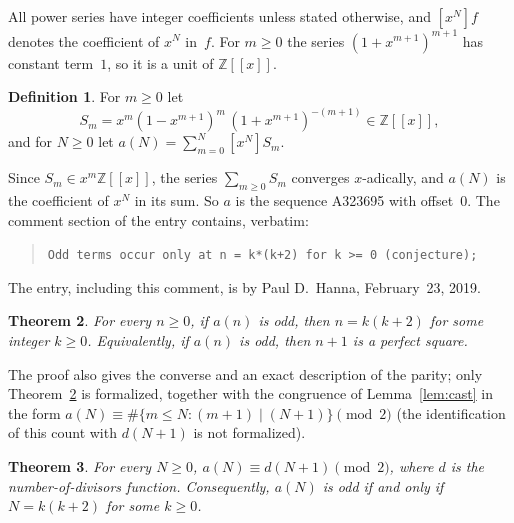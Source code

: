 \documentclass[11pt]{amsart}
\theoremstyle{plain}
\newtheorem{theorem}{Theorem}
\theoremstyle{definition}
\newtheorem{definition}[theorem]{Definition}
\newcommand{\Z}{\mathbb{Z}}
\newcommand{\coef}[1]{[x^{#1}]}
\begin{document}
All power series have integer coefficients unless stated otherwise, and $\coef{N}f$ denotes the coefficient of $x^N$ in~$f$. For $m\ge0$ the series $(1+x^{m+1})^{m+1}$ has constant term~$1$, so it is a unit of $\Z[[x]]$.

\begin{definition}\label{def:main}
For $m\ge0$ let
\[
  S_m=x^m(1-x^{m+1})^m\,(1+x^{m+1})^{-(m+1)}\in\Z[[x]],
\]
and for $N\ge0$ let $a(N)=\sum_{m=0}^{N}\coef{N}S_m$.
\end{definition}

Since $S_m\in x^m\Z[[x]]$, the series $\sum_{m\ge0}S_m$ converges $x$-adically, and $a(N)$ is the coefficient of $x^N$ in its sum. So $a$ is the sequence A323695 with offset~$0$. The comment section of the entry contains, verbatim:
\begin{quote}
\texttt{Odd terms occur only at n = k*(k+2) for k >= 0 (conjecture);}
\end{quote}
The entry, including this comment, is by Paul D.~Hanna, February~23, 2019.

\begin{theorem}\label{thm:main}
For every $n\ge0$, if $a(n)$ is odd, then $n=k(k+2)$ for some integer $k\ge0$. Equivalently, if $a(n)$ is odd, then $n+1$ is a perfect square.
\end{theorem}

The proof also gives the converse and an exact description of the parity; only Theorem~\ref{thm:main} is formalized, together with the congruence of Lemma~\ref{lem:cast} in the form $a(N)\equiv\#\{m\le N:(m+1)\mid(N+1)\}\pmod 2$ (the identification of this count with $d(N+1)$ is not formalized).

\begin{theorem}\label{thm:full}
For every $N\ge0$, $a(N)\equiv d(N+1)\pmod 2$, where $d$ is the number-of-divisors function. Consequently, $a(N)$ is odd if and only if $N=k(k+2)$ for some $k\ge0$.
\end{theorem}
\end{document}
